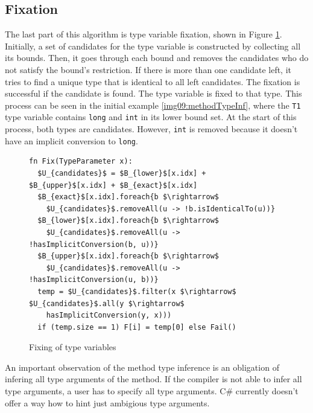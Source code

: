 \subsection{Fixation}

The last part of this algorithm is type variable fixation, shown in Figure \ref{img13:methodTypeInference4}. 
Initially, a set of candidates for the type variable is constructed by collecting all its bounds.
Then, it goes through each bound and removes the candidates who do not satisfy the bound’s restriction. 
If there is more than one candidate left, it tries to find a unique type that is identical to all left candidates. 
The fixation is successful if the candidate is found. 
The type variable is fixed to that type. 
This process can be seen in the initial example \ref{img09:methodTypeInf}, where the \texttt{T1} type variable contains \texttt{long} and \texttt{int} in its lower bound set. 
At the start of this process, both types are candidates. 
However, \texttt{int} is removed because it doesn’t have an implicit conversion to \texttt{long}.
\par
\begin{figure}[h!]
\begin{lstlisting}[style=myAlgo, mathescape=true]
fn Fix(TypeParameter x):
  $U_{candidates}$ = $B_{lower}$[x.idx] + $B_{upper}$[x.idx] + $B_{exact}$[x.idx]
  $B_{exact}$[x.idx].foreach{b $\rightarrow$ 
    $U_{candidates}$.removeAll(u -> !b.isIdenticalTo(u))}
  $B_{lower}$[x.idx].foreach{b $\rightarrow$ 
    $U_{candidates}$.removeAll(u -> !hasImplicitConversion(b, u))}
  $B_{upper}$[x.idx].foreach{b $\rightarrow$ 
    $U_{candidates}$.removeAll(u -> !hasImplicitConversion(u, b))}
  temp = $U_{candidates}$.filter(x $\rightarrow$ $U_{candidates}$.all(y $\rightarrow$ 
    hasImplicitConversion(y, x)))
  if (temp.size == 1) F[i] = temp[0] else Fail()
\end{lstlisting}
\caption{Fixing of type variables}
\label{img13:methodTypeInference4}
\end{figure}
\par
An important observation of the method type inference is an obligation of infering all type arguments of the method.
If the compiler is not able to infer all type arguments, a user has to specify all type arguments.
C\# currently doesn't offer a way how to hint just ambigious type arguments.